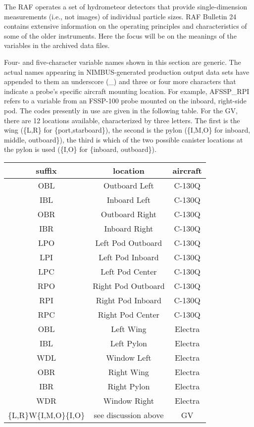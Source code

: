 \documentclass[
  english,
]{book}
\begin{document}
The RAF operates a set of hydrometeor detectors that provide
single-dimension measurements (i.e., not images) of individual particle
sizes. RAF Bulletin 24 contains extensive information on the operating
principles and characteristics of some of the older instruments. Here
the focus will be on the meanings of the variables in the archived data
files.

\protect\hypertarget{VariableNames1DProbes}{}{}Four- and five-character
variable names shown in this section are generic. The actual names
appearing in NIMBUS-generated production output data sets have appended
to them an underscore (\_) and three or four more characters that
indicate a probe's specific aircraft mounting location. For example,
AFSSP\_RPI refers to a variable from an FSSP-100 probe mounted on the
inboard, right-side pod. The codes presently in use are given in the
following table. For the GV, there are 12 locations available,
characterized by three letters. The first is the wing (\{L,R\} for
\{port,starboard\}), the second is the pylon (\{I,M,O\} for inboard,
middle, outboard\}), the third is which of the two possible canister
locations at the pylon is used (\{I,O\} for \{inboard, outboard\}).

\begin{table}
\centering
\begin{tabular}{c|c|c}
\hline
suffix & location & aircraft\\
\hline
OBL & Outboard Left & C-130Q\\
\hline
IBL & Inboard Left & C-130Q\\
\hline
OBR & Outboard Right & C-130Q\\
\hline
IBR & Inboard Right & C-130Q\\
\hline
LPO & Left Pod Outboard & C-130Q\\
\hline
LPI & Left Pod Inboard & C-130Q\\
\hline
LPC & Left Pod Center & C-130Q\\
\hline
RPO & Right Pod Outboard & C-130Q\\
\hline
RPI & Right Pod Inboard & C-130Q\\
\hline
RPC & Right Pod Center & C-130Q\\
\hline
OBL & Left Wing & Electra\\
\hline
IBL & Left Pylon & Electra\\
\hline
WDL & Window Left & Electra\\
\hline
OBR & Right Wing & Electra\\
\hline
IBR & Right Pylon & Electra\\
\hline
WDR & Window Right & Electra\\
\hline
\{L,R\}W\{I,M,O\}\{I,O\} & see discussion above & GV\\
\hline
\end{tabular}
\end{table}
\end{document}

